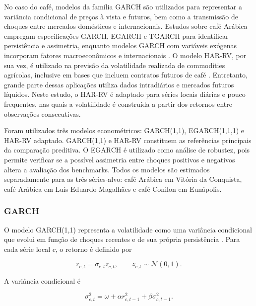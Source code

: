 \documentclass[a4paper,fleqn]{cas-sc}
\begin{document}
No caso do café, modelos da família GARCH são utilizados para representar a variância condicional de preços à vista e futuros, bem como a transmissão de choques entre mercados domésticos e internacionais. Estudos sobre café Arábica empregam especificações GARCH, EGARCH e TGARCH para identificar persistência e assimetria, enquanto modelos GARCH com variáveis exógenas incorporam fatores macroeconômicos e internacionais \citep{Carvalho2023CoffeeGARCH,Rahayu2015CoffeeEGARCH,Chaovanapoonphol2023CoffeeGARCHX,Brun2026GARCHCoffeeRisk}. O modelo HAR-RV, por sua vez, é utilizado na previsão da volatilidade realizada de commodities agrícolas, inclusive em bases que incluem contratos futuros de café \citep{Corsi2009HAR,Bonato2024AgriculturalHAR}. Entretanto, grande parte dessas aplicações utiliza dados intradiários e mercados futuros líquidos. Neste estudo, o HAR-RV é adaptado para séries locais diárias e pouco frequentes, nas quais a volatilidade é construída a partir dos retornos entre observações consecutivas.

Foram utilizados três modelos econométricos: GARCH(1,1), EGARCH(1,1,1) e HAR-RV adaptado. GARCH(1,1) e HAR-RV constituem as referências principais da comparação preditiva. O EGARCH é utilizado como análise de robustez, pois permite verificar se a possível assimetria entre choques positivos e negativos altera a avaliação dos benchmarks. Todos os modelos são estimados separadamente para as três séries-alvo: café Arábica em Vitória da Conquista, café Arábica em Luís Eduardo Magalhães e café Conilon em Eunápolis.

\subsubsection{GARCH}

O modelo GARCH(1,1) representa a volatilidade como uma variância condicional que evolui em função de choques recentes e de sua própria persistência \citep{Bollerslev1986GARCH}. Para cada série local \(c\), o retorno é definido por

\begin{equation}
r_{c,t}=\sigma_{c,t}z_{c,t},
\qquad
z_{c,t}\sim\mathcal{N}(0,1).
\label{eq:garch_return}
\end{equation}

A variância condicional é

\begin{equation}
\sigma_{c,t}^{2}
=
\omega
+\alpha r_{c,t-1}^{2}
+\beta\sigma_{c,t-1}^{2}.
\label{eq:garch}
\end{equation}
\end{document}
